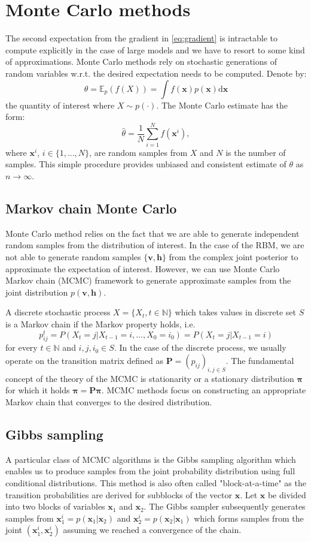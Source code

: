 \section{Monte Carlo methods}
The second expectation from the gradient in \ref{eq:gradient} is intractable to compute explicitly  in the case of large models and we have to resort to some kind of approximations. Monte Carlo methods rely on stochastic generations of random variables w.r.t. the desired expectation needs to be computed. Denote by:
$$ \theta = \mathbb{E}_p(f(X)) = \int f(\mathbf{x})p(\mathbf{x}) \text{d}\mathbf{x}$$
the quantity of interest where $X \sim p(\cdot)$. The Monte Carlo estimate has the form:
$$ \hat{\theta} = \frac{1}{N} \sum_{i=1}^N f(\mathbf{x}^i),$$
where $\mathbf{x}^i$, $i \in \{1,..., N\}$, are random samples from $X$ and $N$ is the number of samples. This simple procedure provides unbiased and consistent estimate of $\theta$ as $n \rightarrow \infty$.

\subsection{Markov chain Monte Carlo}
Monte Carlo method relies on the fact that we are able to generate independent random samples from the distribution of interest. In the case of the RBM, we are not able to generate random samples $\{ \mathbf{v,h} \}$ from the complex joint posterior to approximate the expectation of interest. However, we can use Monte Carlo Markov chain (MCMC) framework to generate approximate samples from the joint distribution $p( \mathbf{v,h} )$.

A discrete stochastic process $X = \{ X_t, t \in \mathbb{N} \}$ which takes values in discrete set $S$ is a Markov chain if the Markov property holds, i.e.
$$p_{ij}^t = P(X_t = j | X_{t-1} = i,  ..., X_{0} = i_0) = P(X_t = j | X_{t-1} = i)$$
for every $t \in \mathbb{N}$ and $i,j, i_0 \in S$. In the case of the discrete process, we usually operate on the transition matrix defined as $\mathbf{P} = (p_{ij})_{i,j \in S}$. The fundamental concept of the theory of the MCMC is stationarity or a stationary distribution $\mathbf{\pi}$ for which it holds $\mathbf{\pi} = \mathbf{P\pi}.$ MCMC methods focus on constructing an appropriate Markov chain that converges to the desired distribution.

\subsection{Gibbs sampling}
A particular class of MCMC algorithms is the Gibbs sampling algorithm which enables us to produce samples from the joint probability distribution using full conditional distributions. This method is also often called "block-at-a-time" as the transition probabilities are derived for subblocks of the vector $\mathbf{x}$. Let $\mathbf{x}$ be divided into two blocks of variables $\mathbf{x}_1$ and $\mathbf{x}_2$. The Gibbs sampler subsequently generates samples from $\mathbf{x}_1^i = p(\mathbf{x}_1 | \mathbf{x}_2)$ and $\mathbf{x}_2^i = p(\mathbf{x}_2 | \mathbf{x}_1)$ which forms samples from the joint $(\mathbf{x}_1^i, \mathbf{x}_2^i)$ assuming we reached a convergence of the chain.
     
